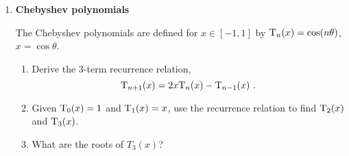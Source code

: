 \documentclass [12pt]{article}
\begin{document}
\begin{enumerate}
\begin{enumerate}
\end{enumerate}


\item {\bf Chebyshev polynomials}

The Chebyshev polynomials are defined for $x\in [-1,1]$ by
$\hbox{T}_n (x)=\cos (n\theta )$, $x=\cos \theta$.

\begin{enumerate}

\item Derive the 3-term recurrence relation,
$$
\hbox{T}_{n+1}(x) = 2x\hbox{T}_n (x) - \hbox{T}_{n-1} (x)~.
$$

\item Given $\hbox{T}_0 (x)=1$ and $\hbox{T}_1 (x)=x$, use the
recurrence relation to find $\hbox{T}_2 (x)$ and $\hbox{T}_3 (x)$.

\item What are the roots of $T_3(x)$?

\end{enumerate}

\end{enumerate}
\end{document}

